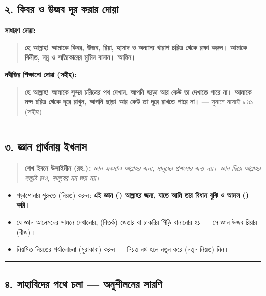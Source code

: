 \subsection*{২. কিবর ও উজব দূর করার দোয়া}

\textbf{সাধারণ দোয়া:}
\begin{quote}
\textbf{হে আল্লাহ! আমাকে কিবর, উজব, রিয়া, হাসাদ ও অন্যান্য খারাপ চরিত্র থেকে রক্ষা করুন। আমাকে বিনীত, নম্র ও সত্যিকারের মুমিন বানান। আমিন।}
\end{quote}

\textbf{নবীজির শিক্ষানো দোয়া (সহীহ):}
\begin{quote}
\textbf{হে আল্লাহ! আমাকে সুন্দর চরিত্রের পথ দেখান, আপনি ছাড়া আর কেউ তা দেখাতে পারে না। আমাকে মন্দ চরিত্র থেকে দূরে রাখুন, আপনি ছাড়া আর কেউ তা দূরে রাখতে পারে না।} — সুনানে নাসাই ৮৬১ (সহীহ)
\end{quote}

\medskip\hrule\medskip

\subsection*{৩. জ্ঞান প্রার্থনায় ইখলাস}

\begin{quote}
\textbf{শেখ ইবনে উসাইমীন (রহ.):} \textit{জ্ঞান একমাত্র আল্লাহর জন্য, মানুষের প্রশংসার জন্য নয়। জ্ঞান দিয়ে আল্লাহর সন্তুষ্টি চাও, মানুষের মন জয় নয়।}
\end{quote}

\begin{itemize}
\item পড়াশোনার শুরুতে  (নিয়ত) করুন: \textbf{এই জ্ঞান () আল্লাহর জন্য, যাতে আমি তার বিধান বুঝি ও আমল () করি।}
\item যে জ্ঞান আলেমদের সামনে দেখানোর,  (বিতর্ক) জেতার বা চাকরির সিঁড়ি বানানোর হয় — সে জ্ঞান উজব-রিয়ার  (বীজ)।
\item নিয়মিত নিয়তের পর্যালোচনা (মুরাকাবা) করুন — নিয়ত নষ্ট হলে নতুন করে   (নতুন নিয়ত) নিন।
\end{itemize}
\medskip\hrule\medskip

\subsection*{৪. সাহাবিদের পথে চলা — অনুশীলনের সারণি}

